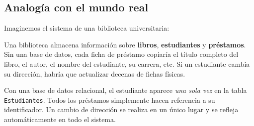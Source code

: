 \subsection{Analogía con el mundo real}

Imaginemos el sistema de una biblioteca universitaria:

\begin{ejemplo}
Una biblioteca almacena información sobre \textbf{libros},
\textbf{estudiantes} y \textbf{préstamos}.
Sin una base de datos, cada ficha de préstamo copiaría el título
completo del libro, el autor, el nombre del estudiante, su carrera,
etc.
Si un estudiante cambia su dirección, habría que actualizar decenas
de fichas físicas.

Con una base de datos relacional, el estudiante aparece
\emph{una sola vez} en la tabla \texttt{Estudiantes}.
Todos los préstamos simplemente hacen referencia a su identificador.
Un cambio de dirección se realiza en un único lugar y se refleja
automáticamente en todo el sistema.
\end{ejemplo}




